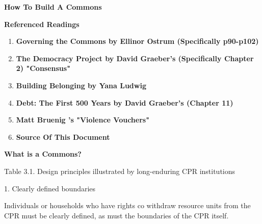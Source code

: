 \documentclass{article}
\begin{document}
	
{\huge \textbf{How To Build A Commons}}


\vspace{1cm}

{\huge \textbf{Referenced Readings}}

\begin{multicols}{2}
\begin{enumerate}
	
	\item \textbf{ Governing the Commons  by Ellinor Ostrum (Specifically p90-p102) } 
	

	\item \textbf{The Democracy Project by David Graeber's  (Specifically Chapter 2)  "Consensus"} 
	
	
	\item \textbf{Building Belonging by Yana Ludwig} 
	
	
	\item \textbf{Debt: The First 500 Years by David Graeber's  (Chapter 11)} 
	
	
	\item \textbf{Matt Bruenig 's "Violence Vouchers"} 
	
	
	\item \textbf{Source Of This Document}
	
	
	 

	
\end{enumerate}
\end{multicols}

\pagebreak
{\huge \textbf{What is a Commons?}}

Table 3.1. Design principles illustrated by long-enduring CPR institutions

1. Clearly defined boundaries

Individuals or households who have rights co withdraw resource units from the CPR must be clearly defined, as must the boundaries of the CPR itself.
\end{document}

